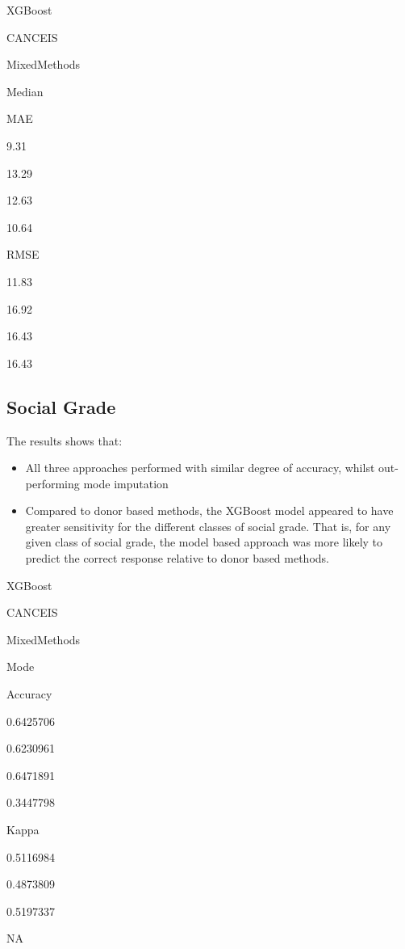 \documentclass[]{book}
\providecommand{\tightlist}{%
  \setlength{\itemsep}{0pt}\setlength{\parskip}{0pt}}
\begin{document}
XGBoost

CANCEIS

MixedMethods

Median

MAE

9.31

13.29

12.63

10.64

RMSE

11.83

16.92

16.43

16.43

\subsection{Social Grade}\label{social-grade}

The results shows that:

\begin{itemize}
\tightlist
\item
  All three approaches performed with similar degree of accuracy, whilst
  out-performing mode imputation\\
\item
  Compared to donor based methods, the XGBoost model appeared to have
  greater sensitivity for the different classes of social grade. That
  is, for any given class of social grade, the model based approach was
  more likely to predict the correct response relative to donor based
  methods.
\end{itemize}

XGBoost

CANCEIS

MixedMethods

Mode

Accuracy

0.6425706

0.6230961

0.6471891

0.3447798

Kappa

0.5116984

0.4873809

0.5197337

NA
\end{document}
